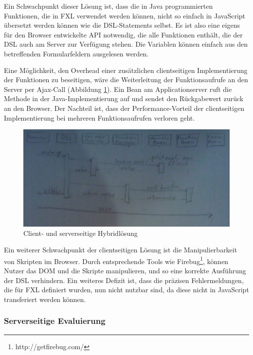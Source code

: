 Ein Schwachpunkt dieser Lösung ist, dass die in Java programmierten Funktionen, die in FXL verwendet werden können, nicht so einfach in JavaScript übersetzt werden können wie die DSL-Statements selbst. Es ist also eine eigens für den Browser entwickelte API notwendig, die alle Funktionen enthält, die der DSL auch am Server zur Verfügung stehen. Die Variablen können einfach aus den betreffenden Formularfeldern ausgelesen werden.

Eine Möglichkeit, den Overhead einer zusätzlichen clientseitigen Implementierung der Funktionen zu beseitigen, wäre die Weiterleitung der Funktionsaufrufe an den Server per Ajax-Call (Abbildung \ref{abb_uml_seq_client_hybrid}). Ein Bean am Applicationserver ruft die Methode in der Java-Implementierung auf und sendet den Rückgabewert zurück an den Browser. Der Nachteil ist, dass der Performance-Vorteil der clientseitigen Implementierung bei mehreren Funktionsaufrufen verloren geht.

\begin{figure}[h]
\includegraphics[scale=0.5]{figures/uml_seq_client_hybrid}
\caption{Client- und serverseitige Hybridlösung}
\label{abb_uml_seq_client_hybrid}
\end{figure}

Ein weiterer Schwachpunkt der clientseitigen Lösung ist die Manipulierbarkeit von Skripten im Browser. Durch entsprechende Tools wie Firebug\footnote{http://getfirebug.com/}, können Nutzer das DOM und die Skripte manipulieren, und so eine korrekte Ausführung der DSL verhindern. Ein weiteres Defizit ist, dass die präzisen Fehlermeldungen, die für FXL definiert wurden, nun nicht nutzbar sind, da diese nicht in JavaScript transferiert werden können.

\subsubsection{Serverseitige Evaluierung}

